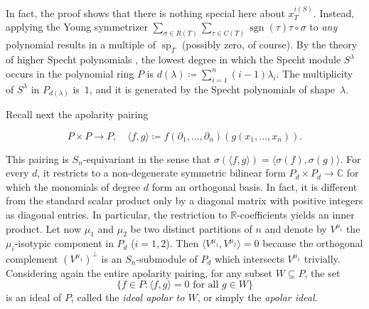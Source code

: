 \documentclass[11pt]{amsart}
\theoremstyle{definition}
\newcommand{\RR}{\mathbb{R}}
\newcommand{\CC}{\mathbb{C}}
\DeclareMathOperator{\spe}{sp}
\DeclareMathOperator{\sgn}{sgn}
\begin{document}
In fact, the proof shows that there is nothing special here about $x_T^{i(S)}$. Instead, applying the Young symmetrizer $\sum_{\sigma \in R(T)} \sum_{\tau \in C(T)} \sgn(\tau) \tau \circ \sigma$ to \emph{any} polynomial results in a multiple of $\spe_T$ (possibly zero, of course). 
By the theory of higher Specht polynomials \cite{Ariki1997Higher,Terasoma1993Higher}, the lowest degree in which the Specht module $S^\lambda$ occurs in the polynomial ring $P$ is $d(\lambda) \coloneqq \sum_{i=1}^n (i-1)\lambda_i$. The multiplicity of $S^\lambda$ in $P_{d(\lambda)}$ is~$1$, and it is generated by the Specht polynomials of shape~$\lambda$.

Recall next the apolarity pairing

\begin{equation*}
    P \times P \longrightarrow P, \quad \langle f , g \rangle \coloneqq f(\partial_1, \ldots, \partial_n)(g(x_1, \ldots, x_n)).
\end{equation*}

This pairing is $S_n$-equivariant in the sense that $\sigma(\langle f, g \rangle) = \langle \sigma(f), \sigma(g) \rangle$. For every $d$, it restricts to a non-degenerate symmetric bilinear form $P_d \times P_d \longrightarrow \CC$ for which the monomials of degree $d$ form an orthogonal basis. In fact, it is different from the standard scalar product only by a diagonal matrix with positive integers as diagonal entries. In particular, the restriction to $\RR$-coefficients yields an inner product. Let now $\mu_1$ and $\mu_2$ be two distinct partitions of $n$ and denote by $V^{\mu_i}$ the $\mu_i$-isotypic component in $P_d$ ($i = 1,2$). Then $\langle V^{\mu_1}, V^{\mu_2} \rangle = 0$ because the orthogonal complement $\left(V^{\mu_1}\right)^\perp$ is an $S_n$-submodule of $P_d$ which intersects $V^{\mu_1}$ trivially. Considering again the entire apolarity pairing, for any subset $W \subseteq P$, the set
\begin{equation*}
    \{f \in P : \langle f, g \rangle = 0 \text{ for all } g \in W\}
\end{equation*}
is an ideal of $P$, called the \emph{ideal apolar to $W$}, or simply the \emph{apolar ideal}.
\end{document}
